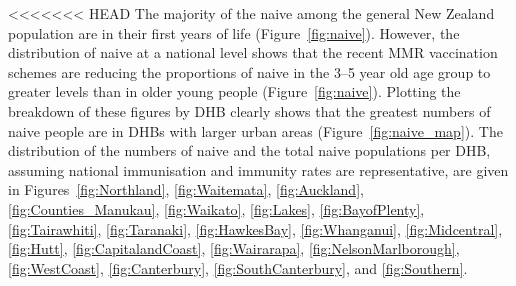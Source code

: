 \documentclass{article}
\begin{document}
\begin{itemize}
<<<<<<< HEAD
The majority of the naive among the general New Zealand population are in their first years of life (Figure~\ref{fig:naive}). However, the distribution of naive at a national level shows that the recent MMR vaccination schemes are reducing the proportions of naive in the 3--5 year old age group to greater levels than in older young people  (Figure~\ref{fig:naive}). Plotting the breakdown of these figures by DHB clearly shows that the greatest numbers of naive people are in DHBs with larger urban areas (Figure~\ref{fig:naive_map}). The distribution of the numbers of naive and the total naive populations per DHB, assuming national immunisation and immunity rates are representative, are given in Figures~\ref{fig:Northland}, \ref{fig:Waitemata}, \ref{fig:Auckland}, \ref{fig:Counties_Manukau}, \ref{fig:Waikato}, \ref{fig:Lakes}, \ref{fig:BayofPlenty}, \ref{fig:Tairawhiti}, \ref{fig:Taranaki}, \ref{fig:HawkesBay}, \ref{fig:Whanganui}, \ref{fig:Midcentral}, \ref{fig:Hutt}, \ref{fig:CapitalandCoast}, \ref{fig:Wairarapa}, \ref{fig:NelsonMarlborough}, \ref{fig:WestCoast}, \ref{fig:Canterbury}, \ref{fig:SouthCanterbury}, and \ref{fig:Southern}.


\end{itemize}
\end{document}

